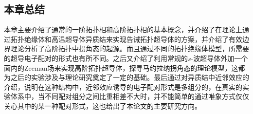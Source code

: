 \subsection{本章总结}
\qquad 本章主要介绍了通常的一阶拓扑相和高阶拓扑相的基本概念，并介绍了在理论上通过拓扑绝缘体和高温超导体异质结来实现告诫拓扑超导体的方案，并介绍了有效边界理论分析了高阶拓扑中拐角态的起源。而且通过不同的拓扑绝缘体模型，所需要的超导电子配对的形式也有所不同。之后又介绍了利用常规的$s$-波超导体外加一个面内的Zeeman场来实现高阶拓扑超导体，探寻马约拉纳拐角态的理论模型，这都为之后的实验涉及与理论研究奠定了一定的基础。最后通过对异质结中近邻效应的介绍，说明在这种结构中，近邻效应诱导的电子配对形式是多组分的，在真实的实验体系中，当不同配对组分之间比重相差不大时，并不能简单的通过唯象方式仅仅关心其中的某一种配对形式，这也给出了本论文的主要研究方向。










